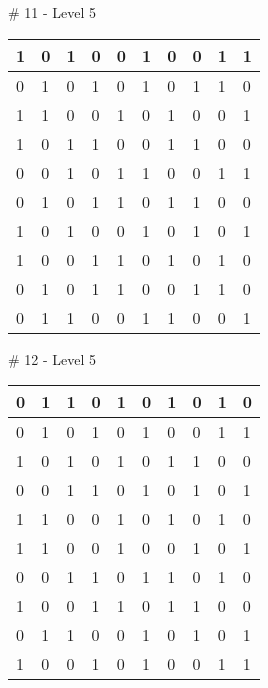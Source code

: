 \smallskip

\# 11 - Level 5 \newline
\begin{tabular}{|m{\collen}|m{\collen}|m{\collen}|m{\collen}|m{\collen}|m{\collen}|m{\collen}|m{\collen}|m{\collen}|m{\collen}|}
\hline
  1 & 0 & 1 & 0 & 0 & 1 & 0 & 0 & 1 & 1 \\
\hline
  0 & 1 & 0 & 1 & 0 & 1 & 0 & 1 & 1 & 0 \\
\hline
  1 & 1 & 0 & 0 & 1 & 0 & 1 & 0 & 0 & 1 \\
\hline
  1 & 0 & 1 & 1 & 0 & 0 & 1 & 1 & 0 & 0 \\
\hline
  0 & 0 & 1 & 0 & 1 & 1 & 0 & 0 & 1 & 1 \\
\hline
  0 & 1 & 0 & 1 & 1 & 0 & 1 & 1 & 0 & 0 \\
\hline
  1 & 0 & 1 & 0 & 0 & 1 & 0 & 1 & 0 & 1 \\
\hline
  1 & 0 & 0 & 1 & 1 & 0 & 1 & 0 & 1 & 0 \\
\hline
  0 & 1 & 0 & 1 & 1 & 0 & 0 & 1 & 1 & 0 \\
\hline
  0 & 1 & 1 & 0 & 0 & 1 & 1 & 0 & 0 & 1 \\
\hline
\end{tabular}


\smallskip

\# 12 - Level 5 \newline
\begin{tabular}{|m{\collen}|m{\collen}|m{\collen}|m{\collen}|m{\collen}|m{\collen}|m{\collen}|m{\collen}|m{\collen}|m{\collen}|}
\hline
  0 & 1 & 1 & 0 & 1 & 0 & 1 & 0 & 1 & 0 \\
\hline
  0 & 1 & 0 & 1 & 0 & 1 & 0 & 0 & 1 & 1 \\
\hline
  1 & 0 & 1 & 0 & 1 & 0 & 1 & 1 & 0 & 0 \\
\hline
  0 & 0 & 1 & 1 & 0 & 1 & 0 & 1 & 0 & 1 \\
\hline
  1 & 1 & 0 & 0 & 1 & 0 & 1 & 0 & 1 & 0 \\
\hline
  1 & 1 & 0 & 0 & 1 & 0 & 0 & 1 & 0 & 1 \\
\hline
  0 & 0 & 1 & 1 & 0 & 1 & 1 & 0 & 1 & 0 \\
\hline
  1 & 0 & 0 & 1 & 1 & 0 & 1 & 1 & 0 & 0 \\
\hline
  0 & 1 & 1 & 0 & 0 & 1 & 0 & 1 & 0 & 1 \\
\hline
  1 & 0 & 0 & 1 & 0 & 1 & 0 & 0 & 1 & 1 \\
\hline
\end{tabular}


\smallskip

